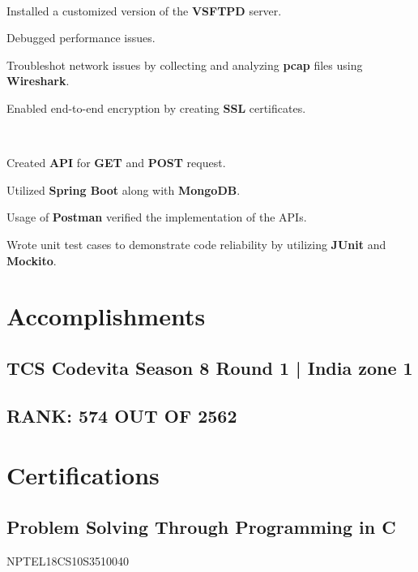 \documentclass[]{deedy-resume-openfont}
\begin{document}
\begin{minipage}[t]{0.66\textwidth}
\\
\begin{tightemize}
\item Installed a customized version of the \textbf{VSFTPD} server.
\item Debugged performance issues.
\item Troubleshot network issues by collecting and analyzing \textbf{pcap} files using \textbf{Wireshark}. 
\item Enabled end-to-end encryption by creating \textbf{SSL} certificates.
\end{tightemize}
\sectionsep

\\
\begin{tightemize}
\item Created \textbf{API} for \textbf{GET} and \textbf{POST} request.
\item Utilized \textbf{Spring Boot} along with \textbf{MongoDB}.
\item Usage of \textbf{Postman} verified the implementation of the APIs.
\item Wrote unit test cases to demonstrate code reliability by utilizing \textbf{JUnit} and \textbf{Mockito}.
\end{tightemize}
\sectionsep


\section{Accomplishments} 
\sectionsep
\subsection{TCS Codevita Season 8 Round 1 | India zone 1}
\subsection{RANK: 574 OUT OF 2562}
\sectionsep


\section{Certifications} 
\sectionsep
\subsection{Problem Solving Through Programming in C}
NPTEL18CS10S3510040 \\
\sectionsep


\end{minipage} 
\end{document}

